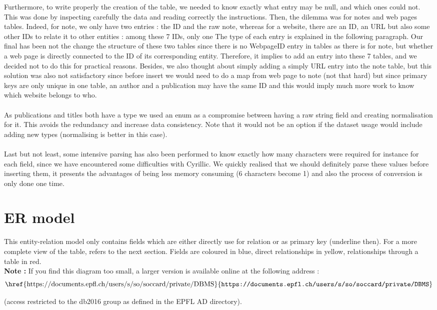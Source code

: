 \documentclass[doubleside, titlepage]{article}
\begin{document}
Furthermore, to write properly the creation of the table, we needed to know exactly what entry may be null, and which ones could not. This was done by inspecting carefully the data and reading correctly the instructions. Then, the dilemma was for notes and web pages tables. Indeed, for note, we only have two entries : the ID and the raw note, whereas for a website, there are an ID, an URL but also some other IDs to relate it to other entities : among these 7 IDs, only one   The type of each entry is explained in the following paragraph. Our final has been not the change the structure of these two tables since there is no WebpageID entry in tables as there is for note, but whether a web page is directly connected to the ID of its corresponding entity. Therefore, it implies to add an entry into these 7 tables, and we decided not to do this for practical reasons. Besides, we also thought about simply adding a simply URL entry into the note table, but this solution was also not satisfactory since before insert we would need to do a map from web page to note (not that hard) but since primary keys are only unique in one table, an author and a publication may have the same ID and this would imply much more work to know which website belongs to who.
~\\~\\
As publications and titles both have a type we used an enum as a compromise between having a raw string field and creating normalisation for it. This avoids the redundancy and increase data consistency. Note that it would not be an option if the dataset usage would include adding new types (normalising is better in this case).
~\\~\\
Last but not least, some intensive parsing has also been performed to know exactly how many characters were required for instance for each field, since we have encountered some difficulties with Cyrillic. We quickly realised that we should definitely parse these values before inserting them, it presents the advantages of being less memory consuming (6 characters become 1) and also the process of conversion is only done one time.
\addtocounter{page}{1}

\section{ER model}

This entity-relation model only contains fields which are either directly use for relation or as primary key (underline then). For a more complete view of the table, refers to the next section. Fields are coloured in blue, direct relationships in yellow, relationships through a table in red.
~\\
\textbf{Note :} If you find this diagram too small, a larger version is available online at the following address : 
$$
\text{\href{https://documents.epfl.ch/users/s/so/soccard/private/DBMS}{\texttt{https://documents.epfl.ch/users/s/so/soccard/private/DBMS}}}
$$
\begin{flushright}
(access restricted to the db2016 group as defined in the EPFL AD directory).
\end{flushright}
\end{document}

